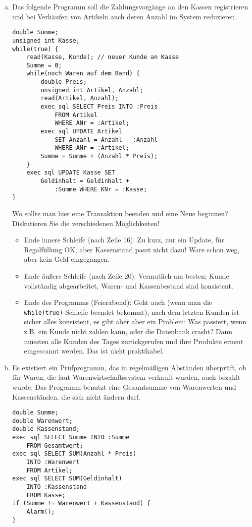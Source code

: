 	\begin{enumerate}[a)]
		\item \label{lbl_Transaktionsende_Kasse} Das folgende Programm soll die Zahlungsvorgänge an den Kassen registrieren und bei Verkäufen von Artikeln auch deren Anzahl im System reduzieren.
		\begin{lstlisting}
double Summe;
unsigned int Kasse;
while(true) {
	read(Kasse, Kunde); // neuer Kunde an Kasse
	Summe = 0;
	while(noch Waren auf dem Band) {
		double Preis;
		unsigned int Artikel, Anzahl;
		read(Artikel, Anzahl);
		exec sql SELECT Preis INTO :Preis 
			FROM Artikel
			WHERE ANr = :Artikel;
		exec sql UPDATE Artikel
			SET Anzahl = Anzahl - :Anzahl
			WHERE ANr = :Artikel;
		Summe = Summe + (Anzahl * Preis);
	}
	exec sql UPDATE Kasse SET
		Geldinhalt = Geldinhalt + 
			:Summe WHERE KNr = :Kasse;
}
\end{lstlisting}

		Wo sollte man hier eine Transaktion beenden und eine Neue beginnen? Diskutieren Sie die verschiedenen Möglichkeiten!

		\begin{solution}
		\begin{itemize}
			\item Ende innere Schleife (nach Zeile 16): Zu kurz, nur ein Update, für Regalfüllung OK, aber Kassenstand passt nicht dazu! Ware schon weg, aber kein Geld eingegangen.
			\item Ende äußere Schleife (nach Zeile 20): Vermutlich am besten; Kunde vollständig abgearbeitet, Waren- und Kassenbestand sind konsistent.
			\item Ende des Programms (Feierabend): Geht auch (wenn man die \texttt{while(true)}-Schleife beendet bekommt), nach dem letzten Kunden ist sicher alles konsistent, es gibt aber aber ein Problem: Was passiert, wenn z.B. ein Kunde nicht zahlen kann, oder die Datenbank crasht? Dann müssten alle Kunden des Tages zurückgerufen und ihre Produkte erneut eingescannt werden. Das ist nicht praktikabel.
		\end{itemize}
		\end{solution}

		\beamertxt{\pagebreak}
		\item \label{lbl_Transaktionsende_Pruefprogr} Es existiert ein Prüfprogramm, das in regelmäßigen Abständen überprüft, ob für Waren, die laut Warenwirtschaftssystem verkauft wurden, auch bezahlt wurde. Das Programm benutzt eine Gesamtsumme von Warenwerten und Kassenständen, die sich nicht ändern darf.
\begin{lstlisting}
double Summe;
double Warenwert;
double Kassenstand;
exec sql SELECT Summe INTO :Summe
	FROM Gesamtwert;
exec sql SELECT SUM(Anzahl * Preis)
	INTO :Warenwert
	FROM Artikel;
exec sql SELECT SUM(Geldinhalt)
	INTO :Kassenstand
	FROM Kasse;
if (Summe != Warenwert + Kassenstand) {
	Alarm();
}
\end{lstlisting}


\end{enumerate}
